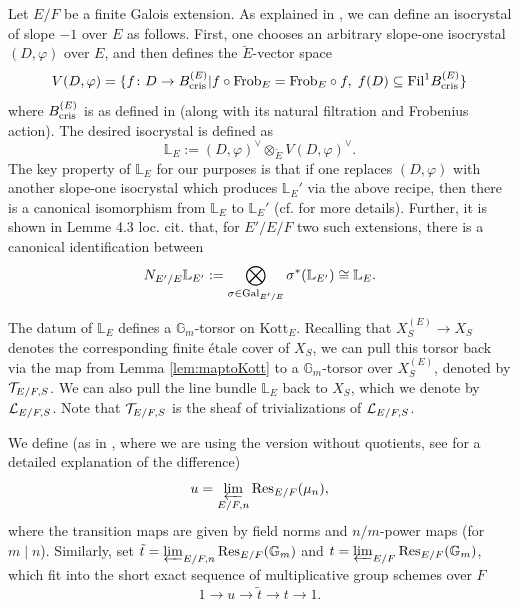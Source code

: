 Let $E/F$ be a finite Galois extension. As explained in \cite[\S 4.1]{Fargues22}, we can define an isocrystal of slope $-1$ over $E$ as follows. First, one chooses an arbitrary slope-one isocrystal $(D,\varphi)$ over $E$, and then defines the $\breve{E}$-vector space
\begin{equation*}
V(D,\varphi) = \{f \colon D \to B_{\textnormal{cris}}^{(E)} | f \circ \textnormal{Frob}_{E} = \textnormal{Frob}_{E} \circ f, \hspace{1mm} f(D) \subseteq \textnormal{Fil}^{1} B_{\textnormal{cris}}^{(E)}\}
\end{equation*}
where $B_{\textnormal{cris}}^{(E)}$ is as defined in \cite[\S 1.2]{FF} (along with its natural filtration and Frobenius action). The desired isocrystal is defined as
\begin{equation*}
    \mathbb{L}_{E} := (D,\varphi)^{\vee} \otimes_{\breve{E}} V(D,\varphi)^{\vee}. 
\end{equation*}
The key property of $\mathbb{L}_{E}$ for our purposes is that if one replaces $(D,\varphi)$ with another slope-one isocrystal which produces $\mathbb{L}_{E}'$ via the above recipe, then there is a canonical isomorphism from $\mathbb{L}_{E}$ to $\mathbb{L}_{E}'$ (cf. \cite[\S 4.1]{Fargues22} for more details). Further, it is shown in Lemme 4.3 loc. cit. that, for $E'/E/F$ two such extensions, there is a canonical identification between 
\begin{equation*}
    N_{E'/E} \mathbb{L}_{E'} := \bigotimes_{\sigma \in \mathrm{Gal}_{E'/E}} \sigma^{*}(\mathbb{L}_{E'}) \cong \mathbb{L}_{E}.
\end{equation*}


\begin{defi}\label{def:LE/F}
The datum of $\mathbb{L}_{E}$ defines a $\mathbb{G}_{m}$-torsor on $\mathrm{Kott}_{E}$. Recalling that $X_{S}^{(E)} \to X_{S}$ denotes the corresponding finite \'{e}tale cover of $X_{S}$, we can pull this torsor back via the map from Lemma \ref{lem:maptoKott} to a $\mathbb{G}_{m}$-torsor over $X_{S}^{(E)}$, denoted by $\mathcal{T}_{E/F,S}$. We can also pull the line bundle $\mathbb{L}_{E}$ back to $X_{S}$, which we denote by $\mathcal{L}_{E/F,S}$. Note that $\mathcal{T}_{E/F,S}$ is the sheaf of trivializations of $\mathcal{L}_{E/F,S}$. 
\end{defi}

We define (as in \cite[\S 3.1]{Kal16}, where we are using the version without quotients, see \cite[Remark 2.12]{BMD26} for a detailed explanation of the difference)
\begin{equation*}
u = \varprojlim_{E/F,n} \mathrm{Res}_{E/F}(\mu_{n}),
\end{equation*}
where the transition maps are given by field norms and $n/m$-power maps (for $m \mid n$). Similarly, set $\tilde{t} = \varprojlim_{E/F,n} \mathrm{Res}_{E/F}(\mathbb{G}_{m})$ and $t = \varprojlim_{E/F} \mathrm{Res}_{E/F}(\mathbb{G}_{m})$, which fit into the short exact sequence of multiplicative group schemes over $F$
\begin{equation*}
1 \to u \to \tilde{t} \to t \to 1.
\end{equation*}

